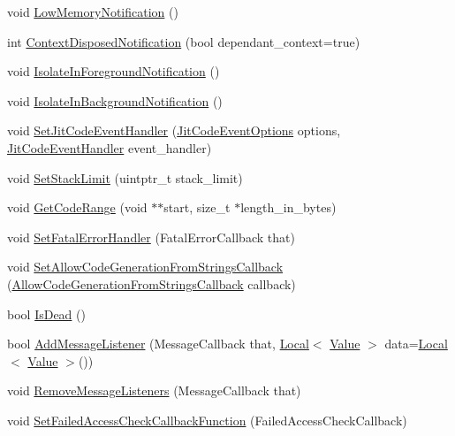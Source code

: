 \begin{DoxyCompactItemize}
\item 
void \hyperlink{classv8_1_1Isolate_aaf446f4877e4707a93d2c406fffd9fd6}{Low\+Memory\+Notification} ()
\item 
int \hyperlink{classv8_1_1Isolate_a4b5216bbb1792211422aee575d02f442}{Context\+Disposed\+Notification} (bool dependant\+\_\+context=true)
\item 
void \hyperlink{classv8_1_1Isolate_afaa09b3cb3a20f53bdcdce4b154d928f}{Isolate\+In\+Foreground\+Notification} ()
\item 
void \hyperlink{classv8_1_1Isolate_a15c1ba9cdb3526a6439e7fddb292ee93}{Isolate\+In\+Background\+Notification} ()
\item 
void \hyperlink{classv8_1_1Isolate_a71d976355bf47eb2dd09cd5d1279a40d}{Set\+Jit\+Code\+Event\+Handler} (\hyperlink{namespacev8_a06f34fa4fa4cfc8518366808d1d461c1}{Jit\+Code\+Event\+Options} options, \hyperlink{namespacev8_a39243bc91e63d64d111452fdb98c4733}{Jit\+Code\+Event\+Handler} event\+\_\+handler)
\item 
void \hyperlink{classv8_1_1Isolate_addbbe14af7efb92999ac3944bc9ffed5}{Set\+Stack\+Limit} (uintptr\+\_\+t stack\+\_\+limit)
\item 
void \hyperlink{classv8_1_1Isolate_a46c7fb2282970530c32740d7e5999b22}{Get\+Code\+Range} (void $\ast$$\ast$start, size\+\_\+t $\ast$length\+\_\+in\+\_\+bytes)
\item 
void \hyperlink{classv8_1_1Isolate_a131f1e2e6a80618ac3c8c266a041851d}{Set\+Fatal\+Error\+Handler} (Fatal\+Error\+Callback that)
\item 
void \hyperlink{classv8_1_1Isolate_ad91199faf0a599c69539af01f5df44e9}{Set\+Allow\+Code\+Generation\+From\+Strings\+Callback} (\hyperlink{namespacev8_a521d909ec201742a1cb35d50a8e2a3c2}{Allow\+Code\+Generation\+From\+Strings\+Callback} callback)
\item 
bool \hyperlink{classv8_1_1Isolate_a603a9bc7860d7936bce2dd45829869c3}{Is\+Dead} ()
\item 
bool \hyperlink{classv8_1_1Isolate_a1aaf99c9ce853fdece7a3b8fc4df49d5}{Add\+Message\+Listener} (Message\+Callback that, \hyperlink{classv8_1_1Local}{Local}$<$ \hyperlink{classv8_1_1Value}{Value} $>$ data=\hyperlink{classv8_1_1Local}{Local}$<$ \hyperlink{classv8_1_1Value}{Value} $>$())
\item 
void \hyperlink{classv8_1_1Isolate_a0319e55b26ba3ac51d867b37b917a21f}{Remove\+Message\+Listeners} (Message\+Callback that)
\item 
void \hyperlink{classv8_1_1Isolate_ab9ef29fc049d82e0c33994632b4f6ba6}{Set\+Failed\+Access\+Check\+Callback\+Function} (Failed\+Access\+Check\+Callback)
$$
\end{DoxyCompactItemize}
